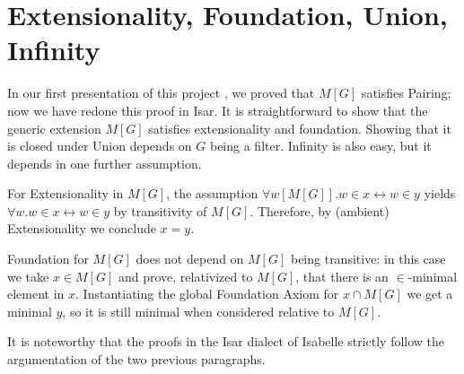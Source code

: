 \section{Extensionality, Foundation, Union, Infinity}
\label{sec:easy-axioms}

In our first presentation of this project \cite{2018arXiv180705174G},
we proved that $M[G]$ satisfies Pairing; now we have redone this proof
in Isar. It is straightforward to show that the generic extension
$M[G]$ satisfies extensionality and foundation. Showing that it is
closed under Union depends on $G$ being a filter. Infinity is also
easy, but it depends in one further assumption.


For Extensionality in $M[G]$, the assumption 
$\forall w[M[G]]. w\in x \leftrightarrow w\in y$ yields 
$\forall w. w\in x \leftrightarrow w\in y$ by transitivity of $M[G]$. %
Therefore, by (ambient) Extensionality we conclude $x=y$. 

Foundation for $M[G]$ does not depend on $M[G]$ being transitive: in
this case we take $x\in M[G]$ and prove, relativized to $M[G]$,  that there is an
$\in$\kern -1pt-minimal element in $x$. Instantiating the global Foundation
Axiom for $x\cap M[G]$ we get a minimal $y$, so it is still minimal
when considered relative to $M[G]$. 

It is noteworthy that the proofs in the Isar dialect of Isabelle
strictly follow the argumentation of the two previous paragraphs.

